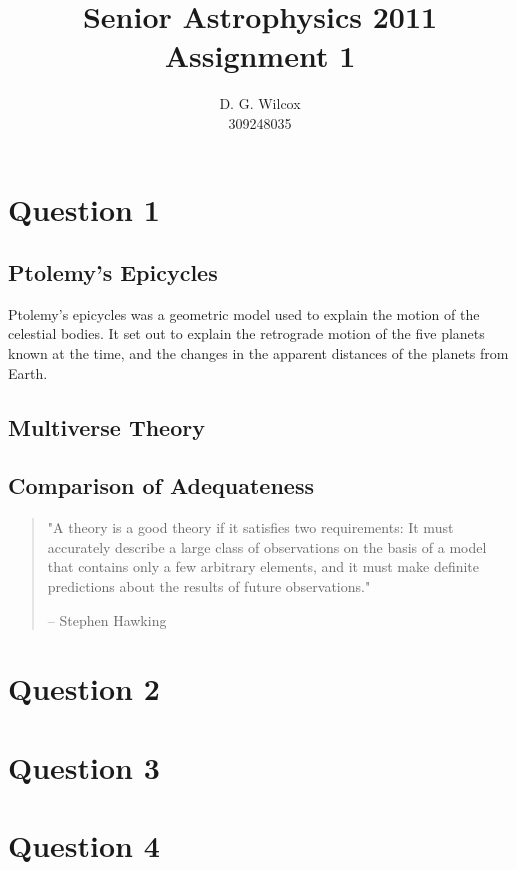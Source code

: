 \documentclass[12pt]{article}
\title{Senior Astrophysics 2011 Assignment 1}
\date{}
\author{D. G. Wilcox \\
		309248035}
\begin{document}
\maketitle
\section*{Question 1}

\subsection*{Ptolemy's Epicycles}
Ptolemy's epicycles was a geometric model used to explain the motion of the celestial bodies. It set out to explain the retrograde motion of the five planets known at the time, and the changes in the apparent distances of the planets from Earth.


\subsection*{Multiverse Theory}

\subsection*{Comparison of Adequateness}
\begin{quote}
	"A theory is a good theory if it satisfies two requirements: It must accurately describe a large class of observations on the basis of a model that contains only a few arbitrary elements, and it must make definite predictions about the results of future observations."

	-- Stephen Hawking
\end{quote}

\section*{Question 2}
\section*{Question 3}
\section*{Question 4}
\end{document}

